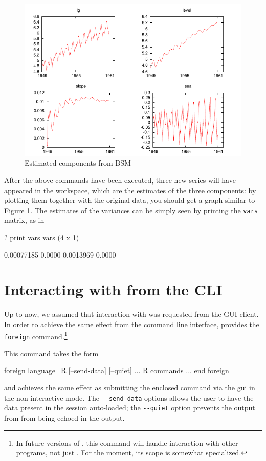 \begin{figure}[htbp]
  \centering
  \includegraphics{figures/BSM-output}
  \caption{Estimated components from BSM}
  \label{fig:BSM-output}
\end{figure}

After the above commands have been executed, three new series will
have appeared in the  workspace, which are the estimates of
the three components: by plotting them together with the original
data, you should get a graph similar to Figure
\ref{fig:BSM-output}. The estimates of the variances can be simply
seen by printing the \texttt{vars} matrix, as in

\begin{code}
? print vars
vars (4 x 1)

  0.00077185 
      0.0000 
   0.0013969 
      0.0000 
\end{code}

\section{Interacting with  from the CLI}
\label{sec:foreign-command}

Up to now, we assumed that interaction with  was requested from
the GUI client. In order to achieve the same effect from the command
line interface,  provides the \texttt{foreign}
command.\footnote{In future versions of , this command will
  handle interaction with other programs, not just . For the
  moment, its scope is somewhat specialized.}

This command takes the form
\begin{code}
foreign language=R [--send-data] [--quiet]
    ... R commands ...
end foreign
\end{code}
and achieves the same effect as submitting the enclosed 
command via the gui in the non-interactive mode. The
\verb|--send-data| options allows the user to have the data present in
the  session auto-loaded; the \verb|--quiet| option
prevents the output from  from being echoed in the 
output.

